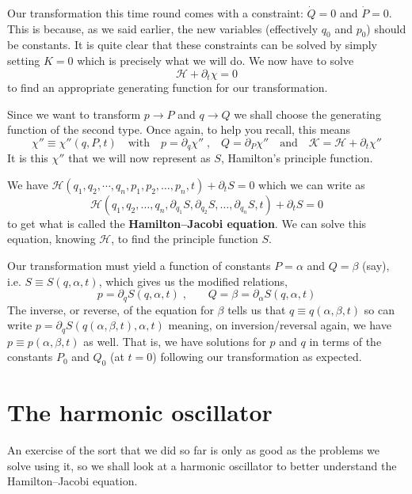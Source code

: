 \documentclass[english,seminar,headertitle]{lecture}
\newcommand{\ham}{\mathscr{H}}
\newcommand{\kam}{\mathscr{K}}
\begin{document}
Our transformation this time round comes with a constraint: $\dot{Q} = 0$ and $\dot{P} = 0$. This is because, as we said earlier, the new variables (effectively $q_0$ and $p_0$) should be constants. It is quite clear that these constraints can be solved by simply setting $K = 0$ which is precisely what we will do. We now have to solve $$\ham + \partial_t \chi = 0$$to find an appropriate generating function for our transformation.

Since we want to transform $p \rightarrow P$ and $q \rightarrow Q$ we shall choose the generating function of the second type. Once again, to help you recall, this means $$\chi'' \equiv \chi''(q,P,t) \quad\textrm{with}\quad p = \partial_q \chi'' \;\textrm{,}\quad Q = \partial_P \chi'' \quad\textrm{and}\quad \kam = \ham + \partial_t \chi''$$It is this $\chi''$ that we will now represent as $S$, Hamilton's principle function.

We have $\ham(q_1, q_2, \cdots, q_n, p_1, p_2, \ldots, p_n, t) + \partial_t S = 0$ which we can write as
\begin{equation}
	\ham(q_1, q_2, \ldots, q_n, \partial_{q_1}S, \partial_{q_2}S, \ldots, \partial_{q_n}S,t) + \partial_t S = 0 \label{eq:Hamilton-Jacobi}
\end{equation}
to get what is called the \textbf{Hamilton--Jacobi equation}. We can solve this equation, knowing $\ham$, to find the principle function $S$.

Our transformation must yield a function of constants $P = \alpha$ and $Q = \beta$ (say), i.e. $S \equiv S(q,\alpha,t)$, which gives us the modified relations,
\begin{equation}
	p = \partial_q S(q,\alpha,t) \;\textrm{,}\qquad Q = \beta = \partial_\alpha S(q,\alpha,t) \label{eq:pQ}
\end{equation}%
The inverse, or reverse, of the equation for $\beta$ tells us that $q \equiv q(\alpha,\beta,t)$ so can write $p = \partial_q S(q(\alpha, \beta, t), \alpha, t)$ meaning, on inversion/reversal again, we have $p \equiv p(\alpha, \beta, t)$ as well. That is, we have solutions for $p$ and $q$ in terms of the constants $P_0$ and $Q_0$ (at $t=0$) following our transformation as expected.

\section{The harmonic oscillator}

An exercise of the sort that we did so far is only as good as the problems we solve using it, so we shall look at a harmonic oscillator to better understand the Hamilton--Jacobi equation.
\end{document}
